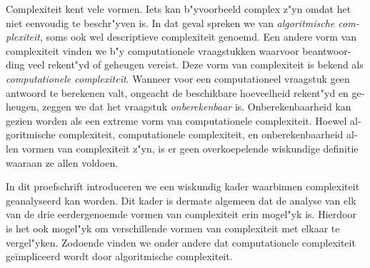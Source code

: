 {\begin{otherlanguage}{dutch}
\samenvatting
Complexiteit kent vele vormen.
Iets kan b"yvoorbeeld complex z"yn omdat het niet eenvoudig te beschr"yven is.
In dat geval spreken we van \emph{algoritmische complexiteit}, soms ook wel descriptieve complexiteit genoemd.
Een andere vorm van complexiteit vinden we b"y computationele vraagstukken waarvoor beantwoording veel rekent"yd of geheugen vereist.
Deze vorm van complexiteit is bekend als \emph{computationele complexiteit}.
Wanneer voor een computationeel vraagstuk geen antwoord te berekenen valt, ongeacht de beschikbare hoeveelheid rekent"yd en geheugen, zeggen we dat het vraagstuk \emph{onberekenbaar} is.
Onberekenbaarheid kan gezien worden als een extreme vorm van computationele complexiteit.
Hoewel algoritmische complexiteit, computationele complexiteit, en onberekenbaarheid allen vormen van complexiteit z"yn, is er geen overkoepelende wiskundige definitie waaraan ze allen voldoen.

In dit proefschrift introduceren we een wiskundig kader waarbinnen complexiteit geanalyseerd kan worden.
Dit kader is dermate algemeen dat de analyse van elk van de drie eerdergenoemde vormen van complexiteit erin mogel"yk is.
Hierdoor is het ook mogel"yk om verschillende vormen van complexiteit met elkaar te vergel"yken.
Zodoende vinden we onder andere dat computationele complexiteit ge{\"i}mpliceerd wordt door algoritmische complexiteit.


\end{otherlanguage}}
